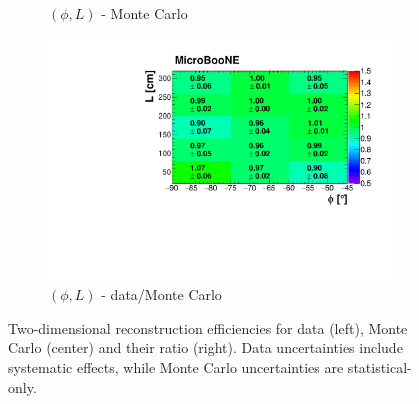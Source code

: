 \documentclass[a4paper,11pt]{article}
\begin{document}
\begin{figure}[htbp]
\begin{subfigure}{0.32\textwidth}
\caption{$(\phi,L)$ - Monte Carlo}
\end{subfigure}\begin{subfigure}{0.32\textwidth}
\includegraphics[width=\linewidth]{figures/phi_l2.pdf}
\caption{$(\phi,L)$ - data/Monte Carlo}
\end{subfigure}
\caption{Two-dimensional reconstruction efficiencies for data (left), Monte Carlo (center) and their ratio (right). Data uncertainties include systematic effects, while Monte Carlo uncertainties are statistical-only.}\label{fig:2d}
\end{figure}
\end{document}
